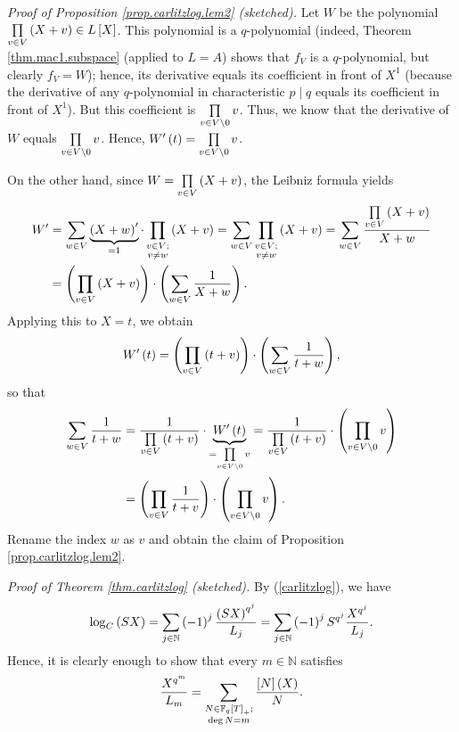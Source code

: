 \documentclass[numbers=enddot,12pt,final,onecolumn,notitlepage]{scrartcl}%
\theoremstyle{definition}
\let\sumnonlimits\sum
\let\prodnonlimits\prod
\renewcommand{\sum}{\sumnonlimits\limits}
\renewcommand{\prod}{\prodnonlimits\limits}
\begin{document}
\textit{Proof of Proposition \ref{prop.carlitzlog.lem2} (sketched).} Let $W$
be the polynomial $\prod\limits_{v\in V}\left(  X+v\right)  \in L\left[
X\right]  $. This polynomial is a $q$-polynomial (indeed, Theorem
\ref{thm.mac1.subspace} (applied to $L=A$) shows that $f_{V}$ is a
$q$-polynomial, but clearly $f_{V}=W$); hence, its derivative equals its
coefficient in front of $X^{1}$ (because the derivative of any $q$-polynomial
in characteristic $p\mid q$ equals its coefficient in front of $X^{1}$). But
this coefficient is $\prod\limits_{v\in V\setminus0}v$. Thus, we know that the
derivative of $W$ equals $\prod\limits_{v\in V\setminus0}v$. Hence,
$W^{\prime}\left(  t\right)  =\prod\limits_{v\in V\setminus0}v$.

On the other hand, since $W=\prod\limits_{v\in V}\left(  X+v\right)  $, the
Leibniz formula yields%
\begin{align*}
W^{\prime}  &  =\sum\limits_{w\in V}\underbrace{\left(  X+w\right)  ^{\prime}%
}_{=1}\cdot\prod\limits_{\substack{v\in V;\\v\neq w}}\left(  X+v\right)
=\sum\limits_{w\in V}\prod\limits_{\substack{v\in V;\\v\neq w}}\left(
X+v\right)  =\sum\limits_{w\in V}\dfrac{\prod\limits_{v\in V}\left(
X+v\right)  }{X+w}\\
&  =\left(  \prod\limits_{v\in V}\left(  X+v\right)  \right)  \cdot\left(
\sum\limits_{w\in V}\dfrac{1}{X+w}\right)  .
\end{align*}
Applying this to $X=t$, we obtain%
\[
W^{\prime}\left(  t\right)  =\left(  \prod\limits_{v\in V}\left(  t+v\right)
\right)  \cdot\left(  \sum\limits_{w\in V}\dfrac{1}{t+w}\right)  ,
\]
so that%
\begin{align*}
\sum\limits_{w\in V}\dfrac{1}{t+w}  &  =\dfrac{1}{\prod\limits_{v\in V}\left(
t+v\right)  }\cdot\underbrace{W^{\prime}\left(  t\right)  }_{=\prod
\limits_{v\in V\setminus0}v}=\dfrac{1}{\prod\limits_{v\in V}\left(
t+v\right)  }\cdot\left(  \prod\limits_{v\in V\setminus0}v\right) \\
&  =\left(  \prod\limits_{v\in V}\dfrac{1}{t+v}\right)  \cdot\left(
\prod\limits_{v\in V\setminus0}v\right)  .
\end{align*}
Rename the index $w$ as $v$ and obtain the claim of Proposition
\ref{prop.carlitzlog.lem2}.

\textit{Proof of Theorem \ref{thm.carlitzlog} (sketched).} By
(\ref{carlitzlog}), we have%
\[
\log_{C}\left(  SX\right)  =\sum\limits_{j\in\mathbb{N}}\left(  -1\right)
^{j}\dfrac{\left(  SX\right)  ^{q^{j}}}{L_{j}}=\sum\limits_{j\in\mathbb{N}%
}\left(  -1\right)  ^{j}S^{q^{j}}\dfrac{X^{q^{j}}}{L_{j}}.
\]
Hence, it is clearly enough to show that every $m\in\mathbb{N}$ satisfies%
\begin{equation}
\dfrac{X^{q^{m}}}{L_{m}}=\sum\limits_{\substack{N\in\mathbb{F}_{q}\left[
T\right]  _{+};\\\deg N=m}}\dfrac{\left[  N\right]  \left(  X\right)  }{N}.
\label{pf.carlitzlog.1}%
\end{equation}
\end{document}
